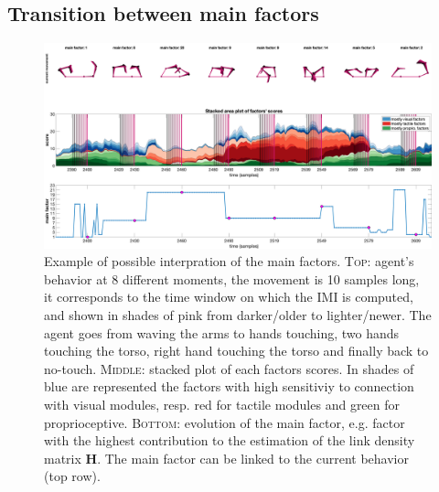 \subsection{Transition between main factors}
\begin{figure}
    \centering
    \includegraphics[width=.99\textwidth]{fig/factors_example_time.png}
    \caption{Example of possible interpration of the main factors. \textsc{Top}: agent's behavior at 8 different moments, the movement is 10 samples long, it corresponds to the time window on which the IMI is computed, and shown in shades of pink from darker/older to lighter/newer. The agent goes from waving the arms to hands touching, two hands touching the torso, right hand touching the torso and finally back to no-touch. \textsc{Middle}: stacked plot of each factors scores. In shades of blue are represented the factors with high sensitiviy to connection with visual modules, resp. red for tactile modules and green for proprioceptive. \textsc{Bottom}: evolution of the main factor, e.g. factor with the highest contribution to the estimation of the link density matrix $\bm{H}$. The main factor can be linked to the current behavior (top row).}
    \label{fig:factors_time}
\end{figure}

